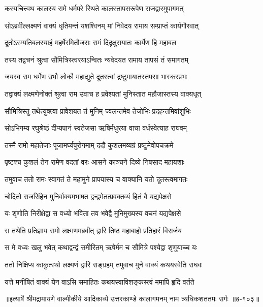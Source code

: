 
\twolineshloka
{कस्यचित्त्वथ कालस्य रामे धर्मपरे स्थिते}
{कालस्तापसरूपेण राजद्वारमुपागमत्} %

\twolineshloka
{सोऽब्रवील्लक्ष्मणं वाक्यं धृतिमन्तं यशश्विनम्}
{मां निवेदय रामाय सम्प्राप्तं कार्यगौरवात्} %

\twolineshloka
{दूतोऽस्म्यतिबलस्याहं महर्षेरमितौजसः}
{रामं दिदृक्षुरायातः कार्येण हि महाबल} %

\twolineshloka
{तस्य तद्वचनं श्रुत्वा सौमित्रिस्त्वरयाऽन्वितः}
{न्यवेदयत रामाय तापसं तं समागतम्} %

\twolineshloka
{जयस्व राम धर्मेण उभौ लोकौ महाद्युते}
{दूतस्त्वां द्रष्टुमायातस्तपसा भास्करप्रभः} %

\twolineshloka
{तद्वाक्यं लक्ष्मणेनोक्तं श्रुत्वा राम उवाच ह}
{प्रवेश्यतां मुनिस्तात महौजास्तस्य वाक्यधृत्} %

\twolineshloka
{सौमित्रिस्तु तथेत्युक्त्वा प्रावेशयत तं मुनिम्}
{ज्वलन्तमेव तेजोभिः प्रदहन्तमिवांशुभिः} %

\twolineshloka
{सोऽभिगम्य रघुश्रेष्ठं दीप्यपानं स्वतेजसा}
{ऋषिर्मधुरया वाचा वर्धस्वेत्याह राघवम्} %

\twolineshloka
{तस्मै रामो महातेजाः पूजामर्घ्यपुरोगमाम्}
{ददौ कुशलमव्यग्रं प्रष्टुमेवोपचक्रमे} %

\twolineshloka
{पृष्टश्च कुशलं तेन रामेण वदतां वरः}
{आसने काञ्चने दिव्ये निषसाद महायशाः} %

\twolineshloka
{तमुवाच ततो रामः स्वागतं ते महामुने}
{प्रापयास्य च वाक्यानि यतो दूतस्त्वमागतः} %

\twolineshloka
{चोदितो राजसिंहेन मुनिर्वाक्यमभाषत}
{द्वन्द्वमेतत्प्रवक्तव्यं हितं वै यद्यपेक्षसे} %

\twolineshloka
{यः शृणोति निरीक्षेद्वा स वध्यो भविता तव}
{भवेद्वै मुनिमुख्यस्य वचनं यद्यपेक्षसे} %

\twolineshloka
{स तथेति प्रतिज्ञाय रामो लक्ष्मणमब्रवीत्}
{द्वारि तिष्ठ महाबाहो प्रतिहारं विसर्जय} %

\twolineshloka
{स मे वध्यः खलु भवेत् कथाद्वन्द्वं समीरितम्}
{ऋषेर्मम च सौमित्रे पश्येद्वा शृणुयाच्च यः} %

\twolineshloka
{ततो निक्षिप्य काकुत्स्थो लक्ष्मणं द्वारि सङ्ग्रहम्}
{तमुवाच मुने वाक्यं कथयस्वेति राघवः} %

\twolineshloka
{यत्ते मनीषितं वाक्यं येन वाऽसि समाहितः}
{कथयस्वाविशङ्कस्त्वं ममापि हृदि वर्तते} %


॥इत्यार्षे श्रीमद्रामायणे वाल्मीकीये आदिकाव्ये उत्तरकाण्डे कालागमनम् नाम त्र्यधिकशततमः सर्गः ॥७-१०३॥
